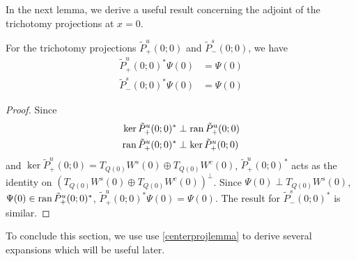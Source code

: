 \documentclass[thesis.tex]{subfiles}
\begin{document}
In the next lemma, we derive a useful result concerning the adjoint of the trichotomy projections at $x = 0$.

\begin{lemma}\label{lemma:trichadjoint}
For the trichotomy projections $\tilde{P}_+^u(0; 0)$ and $\tilde{P}_-^s(0; 0)$, we have
\begin{equation}
\begin{aligned}
\tilde{P}_+^u(0; 0)^* \Psi(0) &= \Psi(0) \\
\tilde{P}_-^s(0; 0)^* \Psi(0) &= \Psi(0)
\end{aligned}
\end{equation}
\begin{proof}
Since
\begin{align*}
\mathop\mathrm{ker}\nolimits \tilde{P}_+^u(0; 0)^* &\perp \operatorname{ran} \tilde{P}_+^u(0; 0) \\
\operatorname{ran} \tilde{P}_+^u(0; 0)^* &\perp \mathop\mathrm{ker}\nolimits \tilde{P}_+^u(0; 0)
\end{align*}
and $\ker \tilde{P}_+^u(0; 0) = T_{Q(0)} W^s(0) \oplus T_{Q(0)} W^c(0)$, $\tilde{P}_+^u(0; 0)^*$ acts as the identity on $(T_{Q(0)} W^s(0) \oplus T_{Q(0)} W^c(0))^\perp$. Since $\Psi(0) \perp T_{Q(0)} W^s(0)$, $\Psi(0) \in \operatorname{ran} \tilde{P}_+^u(0; 0)^*$, $\tilde{P}_+^u(0; 0)^* \Psi(0) = \Psi(0)$. The result for $\tilde{P}_-^s(0; 0)^*$ is similar.
\end{proof}
\end{lemma}

To conclude this section, we use use \cref{centerprojlemma} to derive several expansions which will be useful later.
\end{document}
